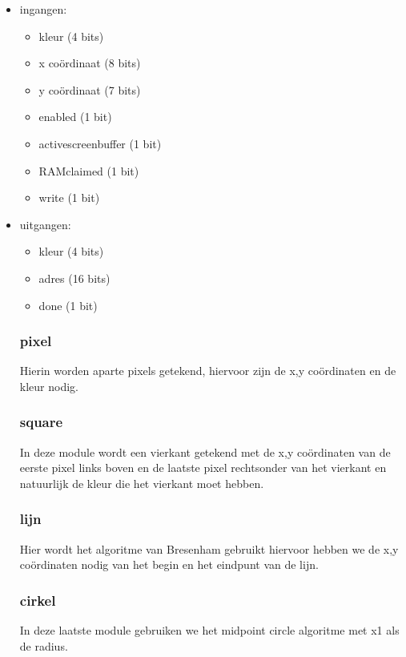 \documentclass{scrartcl}
\begin{document}
\begin {itemize}
\item ingangen:
\begin {itemize}
\item kleur (4 bits)
\item x coördinaat (8 bits)
\item y coördinaat (7 bits)
\item enabled (1 bit)
\item activescreenbuffer (1 bit)
\item RAMclaimed (1 bit)
\item write (1 bit)
\end {itemize}

\item uitgangen:
\begin {itemize}
\item kleur (4 bits)
\item adres (16 bits)
\item done (1 bit)
\end {itemize}


\subsubsection { pixel}

Hierin worden aparte pixels getekend, hiervoor zijn de x,y coördinaten en de kleur nodig.


\subsubsection { square}

In deze module wordt een vierkant getekend met de x,y coördinaten van de eerste pixel links boven en de laatste pixel rechtsonder van het vierkant en natuurlijk de kleur die het vierkant moet hebben.

\subsubsection { lijn}

Hier wordt het algoritme van Bresenham gebruikt hiervoor hebben we de x,y coördinaten nodig van het begin en het eindpunt van de lijn.

\subsubsection { cirkel}

In deze laatste module gebruiken we het midpoint circle algoritme met x1 als de radius.



\end{itemize}
\end{document}
